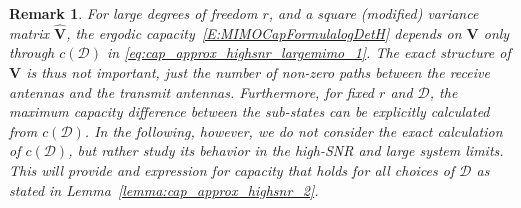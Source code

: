\documentclass[10pt,conference]{IEEEtran}
\newtheorem{remark}{Remark}
\newcommand{\modV}{\hat{\mathbf{V}}}
\newcommand{\rankH}{r}
\begin{document}
\begin{remark}
	For large degrees of freedom $\rankH$, and a square (modified) variance matrix $\modV$, the ergodic capacity~\eqref{E:MIMOCapFormulalogDetH} depends on  $\mathbf{V}$ only through $c(\mathcal{D})$ in \eqref{eq:cap_approx_highsnr_largemimo_1}.
The exact structure of $\mathbf{V}$ is thus not important, just the number of non-zero paths between the receive antennas and the transmit antennas.  Furthermore,
for fixed $\rankH$ and $\mathcal{D}$, the maximum capacity difference between the sub-states can be explicitly calculated from $c(\mathcal{D})$.  In the following, however, we do not consider the exact calculation of $c(\mathcal{D})$, but rather study its behavior in the high-SNR and large system limits.  This will provide and expression for capacity that holds for all choices of $\mathcal{D}$ as stated in Lemma~\ref{lemma:cap_approx_highsnr_2}.
\end{remark}
\end{document}
